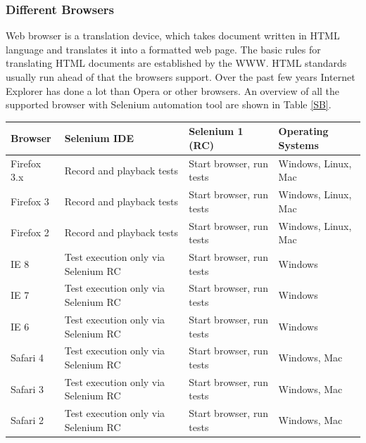 \documentclass[article,type=msc,colorback,accentcolor=tud9c,twoside,11pt]{tudthesis}
\begin{document}
	\subsubsection{Different Browsers}
	Web browser is a translation device, which takes document written in HTML language and translates it into a formatted web page. The basic rules for translating HTML documents are established by the WWW. HTML standards usually run ahead of that the browsers support. Over the past few years Internet Explorer has done a lot than Opera or other browsers. An overview of all the supported browser with Selenium automation tool are shown in Table \ref{SB}.
	\begin{table}[H]
		\centering
		\begin{tabular}{|l|l|l|l|}
			\hline
			\textbf{Browser} & \textbf{Selenium IDE} & \textbf{Selenium 1 (RC)} 
			& \textbf{Operating Systems}\\ \hline
			Firefox 3.x   & Record and playback tests             & Start browser, run tests  & Windows, Linux, Mac    \\ \hline
			
			Firefox 3  & Record and playback tests             & Start browser, run tests  & Windows, Linux, Mac    \\ \hline
			
			Firefox 2  & Record and playback tests             & Start browser, run tests  & Windows, Linux, Mac    \\ \hline
			
			IE 8  & Test execution only via Selenium RC             & Start browser, run tests  & Windows    \\ \hline
			
			IE 7  & Test execution only via Selenium RC             & Start browser, run tests  & Windows    \\ \hline
			
			IE 6  & Test execution only via Selenium RC             & Start browser, run tests  & Windows    \\ \hline
			
			Safari 4  & Test execution only via Selenium RC             & Start browser, run tests  & Windows, Mac    \\ \hline
			
			Safari 3  & Test execution only via Selenium RC             & Start browser, run tests  & Windows, Mac    \\ \hline
			
			Safari 2  & Test execution only via Selenium RC             & Start browser, run tests  & Windows, Mac    \\ \hline
			

\end{tabular}
\end{table}
\end{document}
